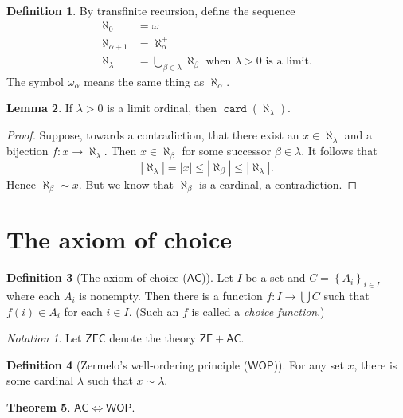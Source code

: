 \documentclass[10pt,letterpaper,cm]{nupset}
\theoremstyle{definition}
\newtheorem{definition}{Definition}[subsection]
\theoremstyle{theorem}
\newtheorem{theorem}[definition]{Theorem}
\newtheorem{lemma}[definition]{Lemma}
\theoremstyle{remark}
\newtheorem*{notation}{Notation}
\newcommand{\1}{\mathbf{1}}
\newcommand{\0}{\vec 0}
\newcommand{\zf}{\mathsf{ZF}}
\newcommand{\zfc}{\mathsf{ZFC}}
\newcommand{\ac}{\mathsf{AC}}
\DeclareMathOperator{\card}{\mathtt{card}}
\begin{document}
\begin{definition}
By transfinite recursion, define the sequence
\begin{align*}
\aleph_0 & = \omega
\\ \aleph_{\alpha +1} & =\aleph_{\alpha}^+
\\ \aleph_{\lambda} & = \bigcup_{\beta \in \lambda} \aleph_{\beta} \text{ when }\lambda >0 \text{ is a limit.}
\end{align*}   The symbol $\omega_{\alpha}$ means the same thing as $\aleph_{\alpha}$.
\end{definition}

\begin{lemma}
If $\lambda >0$ is a limit ordinal, then $\card(\aleph_{\lambda})$.
\end{lemma}
\begin{proof}
Suppose, towards a contradiction, that there exist  an $x\in \aleph_{\lambda}$ and a bijection $f: x \to \aleph_{\lambda}$. Then $x\in \aleph_{\beta}$ for some successor $\beta \in \lambda$. It follows that $$\left\lvert{ \aleph_{\lambda}  }\right\rvert = \left\lvert{ x  }\right\rvert \leq \left\lvert{  \aleph_{\beta} }\right\rvert \leq \left\lvert{ \aleph_{\lambda}  }\right\rvert .$$ Hence $ \aleph_{\beta} \sim x$. But we know that $\aleph_{\beta} $ is a cardinal, a contradiction. 
\end{proof}

\section{The axiom of choice}

\begin{definition}[The axiom of choice ($\ac$)]
Let $I$ be a set and $C = \left\{A_i  \right\}_{i\in I}$ where each $A_i$ is nonempty. Then there is a function $f : I \to \bigcup{C}$ such that $f(i) \in A_i$ for each $i\in I$. (Such an $f$ is called a \textit{choice function}.)
\end{definition}


\begin{notation}
Let $\zfc$ denote the theory $\zf + \ac$.
\end{notation}

\begin{definition}[Zermelo's well-ordering principle ($\mathsf{WOP}$)]
For any set $x$, there is some cardinal $\lambda$ such that $x \sim \lambda$.
\end{definition}

\begin{theorem}\label{AW}
$\ac \iff \mathsf{WOP}$.
\end{theorem}
\end{document}
